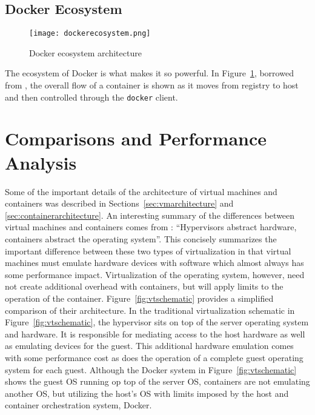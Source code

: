 \subsection{Docker Ecosystem} %
\label{sec:dockerecosystem}
\begin{figure}
    \centering
    \texttt{[image: dockerecosystem.png]}
    \caption{Docker ecosystem architecture}
    \label{fig:dockerecosystem}
\end{figure}

The ecosystem of Docker is what makes it so powerful.  
In Figure~\ref{fig:dockerecosystem}, borrowed from \autocite{dockerarch1}, the overall flow of a container is shown as it moves from registry to host and then controlled through the \texttt{docker} client.  

\section{Comparisons and Performance Analysis} %
\label{sec:comparisons_performance_analysis}
Some of the important details of the architecture of virtual machines and containers was described in Sections~\ref{sec:vmarchitecture} and \ref{sec:containerarchitecture}.
An interesting summary of the differences between virtual machines and containers comes from \autocite{morabitohypervisors}: ``Hypervisors abstract hardware, containers abstract the operating system''. 
This concisely summarizes the important difference between these two types of virtualization in that virtual machines must emulate hardware devices with software which almost always has some performance impact.  
Virtualization of the operating system, however, need not create additional overhead with containers, but will apply limits to the operation of the container. 
Figure~\ref{fig:vtschematic} provides a simplified comparison of their architecture. 
In the traditional virtualization schematic in Figure~\ref{fig:vtschematic}, the hypervisor sits on top of the server operating system and hardware.
It is responsible for mediating access to the host hardware as well as emulating devices for the guest.  
This additional hardware emulation comes with some performance cost as does the operation of a complete guest operating system for each guest.  
Although the Docker system in Figure~\ref{fig:vtschematic} shows the guest OS running op top of the server OS, containers are not emulating another OS, but utilizing the host's OS with limits imposed by the host and container orchestration system, Docker.

